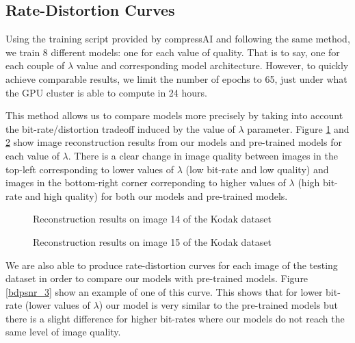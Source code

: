 \subsection{Rate-Distortion Curves}
Using the training script provided by compressAI and following the same method, we train 8 different models: one for each value of \textsf{quality}. That is to say, one for each couple of \(\lambda\) value and corresponding model architecture. However, to quickly achieve comparable results, we limit the number of epochs to 65, just under what the GPU cluster is able to compute in 24 hours.

This method allows us to compare models more precisely by taking into account the bit-rate/distortion tradeoff induced by the value of \(\lambda\) parameter. Figure \ref{bdpsnr_1} and \ref{bdpsnr_2} show image reconstruction results from our models and pre-trained models for each value of \(\lambda\). There is a clear change in image quality between images in the top-left corresponding to lower values of \(\lambda\) (low bit-rate and low quality) and images in the bottom-right corner correponding to higher values of \(\lambda\) (high bit-rate and high quality) for both our models and pre-trained models.

\begin{figure}[H]
    \centering
    \caption{Reconstruction results on image 14 of the Kodak dataset}
    \label{bdpsnr_1}
\end{figure}

\begin{figure}[H]
    \centering
    \caption{Reconstruction results on image 15 of the Kodak dataset}
    \label{bdpsnr_2}
\end{figure}

We are also able to produce rate-distortion curves for each image of the testing dataset in order to compare our models with pre-trained models. Figure \ref{bdpsnr_3} show an example of one of this curve. This shows that for lower bit-rate (lower values of \(\lambda\)) our model is very similar to the pre-trained models but there is a slight difference for higher bit-rates where our models do not reach the same level of image quality.


